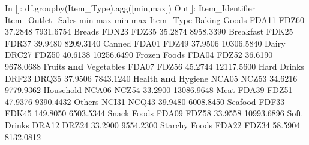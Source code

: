 \documentclass[
]{book}
\newenvironment{Shaded}{\begin{snugshade}}{\end{snugshade}}
\newcommand{\BuiltInTok}[1]{#1}
\newcommand{\FloatTok}[1]{\textcolor[rgb]{0.00,0.00,0.81}{#1}}
\newcommand{\KeywordTok}[1]{\textcolor[rgb]{0.13,0.29,0.53}{\textbf{#1}}}
\newcommand{\NormalTok}[1]{#1}
\newcommand{\StringTok}[1]{\textcolor[rgb]{0.31,0.60,0.02}{#1}}
\begin{document}
\begin{Shaded}
\begin{Highlighting}[]
\NormalTok{In []: df.groupby(}\StringTok{\textquotesingle{}Item\_Type\textquotesingle{}}\NormalTok{).agg([}\StringTok{\textquotesingle{}min\textquotesingle{}}\NormalTok{,}\StringTok{\textquotesingle{}max\textquotesingle{}}\NormalTok{])}
\NormalTok{Out[]:}
\NormalTok{                      Item\_Identifier        Item\_Outlet\_Sales            }
                                  \BuiltInTok{min}    \BuiltInTok{max}               \BuiltInTok{min}         \BuiltInTok{max}
\NormalTok{Item\_Type                                                                 }
\NormalTok{Baking Goods                    FDA11  FDZ60           }\FloatTok{37.2848}   \FloatTok{7931.6754}
\NormalTok{Breads                          FDN23  FDZ35           }\FloatTok{35.2874}   \FloatTok{8958.3390}
\NormalTok{Breakfast                       FDK25  FDR37           }\FloatTok{39.9480}   \FloatTok{8209.3140}
\NormalTok{Canned                          FDA01  FDZ49           }\FloatTok{37.9506}  \FloatTok{10306.5840}
\NormalTok{Dairy                           DRC27  FDZ50           }\FloatTok{40.6138}  \FloatTok{10256.6490}
\NormalTok{Frozen Foods                    FDA04  FDZ52           }\FloatTok{36.6190}   \FloatTok{9678.0688}
\NormalTok{Fruits }\KeywordTok{and}\NormalTok{ Vegetables           FDA07  FDZ56           }\FloatTok{45.2744}  \FloatTok{12117.5600}
\NormalTok{Hard Drinks                     DRF23  DRQ35           }\FloatTok{37.9506}   \FloatTok{7843.1240}
\NormalTok{Health }\KeywordTok{and}\NormalTok{ Hygiene              NCA05  NCZ53           }\FloatTok{34.6216}   \FloatTok{9779.9362}
\NormalTok{Household                       NCA06  NCZ54           }\FloatTok{33.2900}  \FloatTok{13086.9648}
\NormalTok{Meat                            FDA39  FDZ51           }\FloatTok{47.9376}   \FloatTok{9390.4432}
\NormalTok{Others                          NCI31  NCQ43           }\FloatTok{39.9480}   \FloatTok{6008.8450}
\NormalTok{Seafood                         FDF33  FDK45          }\FloatTok{149.8050}   \FloatTok{6503.5344}
\NormalTok{Snack Foods                     FDA09  FDZ58           }\FloatTok{33.9558}  \FloatTok{10993.6896}
\NormalTok{Soft Drinks                     DRA12  DRZ24           }\FloatTok{33.2900}   \FloatTok{9554.2300}
\NormalTok{Starchy Foods                   FDA22  FDZ34           }\FloatTok{58.5904}   \FloatTok{8132.0812}
\end{Highlighting}
\end{Shaded}
\end{document}
